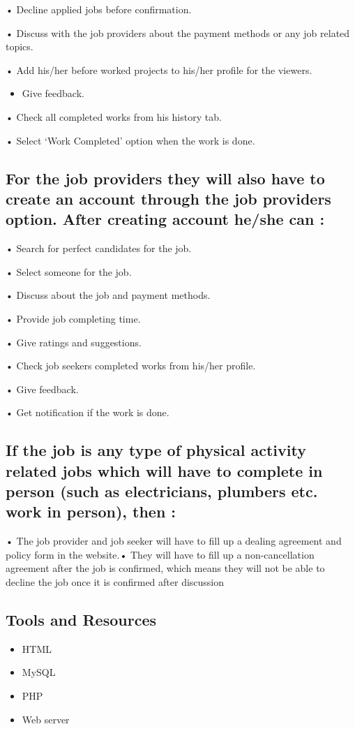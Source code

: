 \documentclass{article}
\begin{document}
• Decline applied jobs before confirmation.

• Discuss with the job providers about the payment 
    methods or any job   related topics.

• Add his/her before worked projects to his/her profile 
   for the viewers.
\begin{itemize}
\item Give feedback.
\end{itemize}

• Check all completed works from his history tab.


• Select ‘Work Completed’ option when the work is 
   done.
\subsection{For the job providers they will also have to create an 
account through the job providers option. After creating 
account he/she can :}
• Search for perfect candidates for the job.

• Select someone for the job.

• Discuss about the job and payment methods.

• Provide job completing time.

• Give ratings and suggestions.

• Check job seekers completed works from his/her 
profile.

• Give feedback.

• Get notification if the work is done.
\subsection{If the job is any type of physical activity related jobs which 
will have to complete in person (such as electricians, 
plumbers etc. work in person), then :}

• The job provider and job seeker will have to fill up a
dealing agreement and policy form in the website.• They will have to fill up a non-cancellation agreement 
after the job is confirmed, which means they will not 
be able to decline the job once it is confirmed after 
discussion
\subsection{Tools and Resources}
\begin{itemize}
\item HTML
\end{itemize}
\begin{itemize}
\item MySQL
\end{itemize}
\begin{itemize}
\item PHP
\end{itemize}
\begin{itemize}
\item Web server
\end{itemize}
\end{document}
